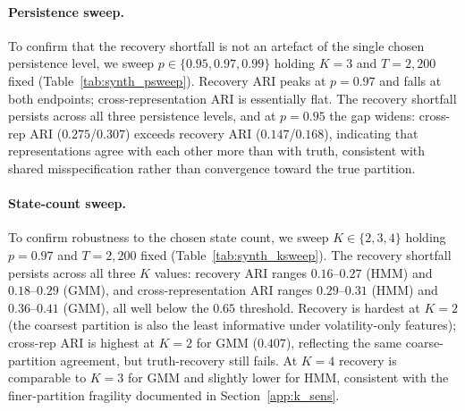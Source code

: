 \documentclass[preprint,12pt,authoryear]{elsarticle}
\begin{document}
\paragraph{Persistence sweep.}
To confirm that the recovery shortfall is not an artefact of the single chosen persistence level, we sweep $p \in \{0.95, 0.97, 0.99\}$ holding $K=3$ and $T=2{,}200$ fixed (Table~\ref{tab:synth_psweep}). Recovery ARI peaks at $p=0.97$ and falls at both endpoints; cross-representation ARI is essentially flat. The recovery shortfall persists across all three persistence levels, and at $p=0.95$ the gap widens: cross-rep ARI ($0.275$/$0.307$) exceeds recovery ARI ($0.147$/$0.168$), indicating that representations agree with each other more than with truth, consistent with shared misspecification rather than convergence toward the true partition.

\paragraph{State-count sweep.}
To confirm robustness to the chosen state count, we sweep $K \in \{2, 3, 4\}$ holding $p=0.97$ and $T=2{,}200$ fixed (Table~\ref{tab:synth_ksweep}). The recovery shortfall persists across all three $K$ values: recovery ARI ranges $0.16$--$0.27$ (HMM) and $0.18$--$0.29$ (GMM), and cross-representation ARI ranges $0.29$--$0.31$ (HMM) and $0.36$--$0.41$ (GMM), all well below the $0.65$ threshold. Recovery is hardest at $K=2$ (the coarsest partition is also the least informative under volatility-only features); cross-rep ARI is highest at $K=2$ for GMM ($0.407$), reflecting the same coarse-partition agreement, but truth-recovery still fails. At $K=4$ recovery is comparable to $K=3$ for GMM and slightly lower for HMM, consistent with the finer-partition fragility documented in Section~\ref{app:k_sens}.
\end{document}

